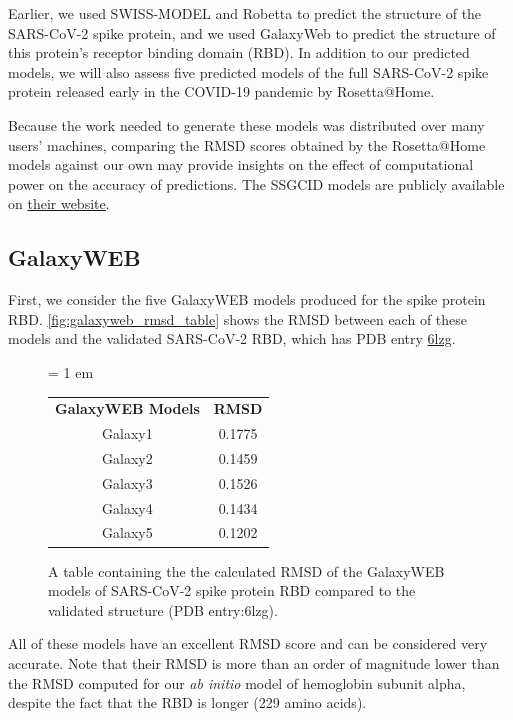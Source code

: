 Earlier, we used SWISS-MODEL and Robetta to predict the structure of the SARS-CoV-2 spike protein, and we used GalaxyWeb to predict the structure of this protein's receptor binding domain (RBD). In addition to our predicted models, we will also assess five predicted models of the full SARS-CoV-2 spike protein released early in the COVID-19 pandemic by Rosetta@Home.

Because the work needed to generate these models was distributed over many users' machines, comparing the RMSD scores obtained by the Rosetta@Home models against our own may provide insights on the effect of computational power on the accuracy of predictions. The SSGCID models are publicly available on \href{https://www.ssgcid.org/cttdb/molecularmodel_list/?target__icontains=BewuA}{their website}.

\FloatBarrier
{}
\subsection{GalaxyWEB}

First, we consider the five GalaxyWEB models produced for the spike protein RBD. \autoref{fig:galaxyweb_rmsd_table} shows the RMSD between each of these models and the validated SARS-CoV-2 RBD, which has PDB entry \href{https://www.rcsb.org/structure/6lzg}{6lzg}.\\

\begin{figure}[h]
	\centering
	\tabcolsep = 1 em
	\mySfFamily
	\begin{tabular}{c c}
		\textbf{GalaxyWEB Models} & \textbf{RMSD} \\
		Galaxy1 & 0.1775 \\
		Galaxy2 & 0.1459 \\
		Galaxy3 & 0.1526 \\
		Galaxy4 & 0.1434 \\
		Galaxy5 & 0.1202 \\
	\end{tabular}
	\caption{A table containing the the calculated RMSD of the GalaxyWEB models of SARS-CoV-2 spike protein RBD compared to the validated structure (PDB entry:6lzg).}
	\label{fig:galaxyweb_rmsd_table}
\end{figure}

All of these models have an excellent RMSD score and can be considered very accurate. Note that their RMSD is more than an order of magnitude lower than the RMSD computed for our \textit{ab initio} model of hemoglobin subunit alpha, despite the fact that the RBD is longer (229 amino acids).

